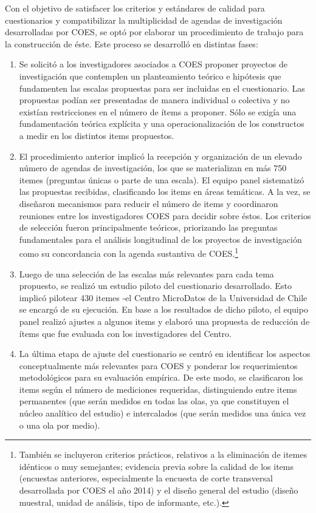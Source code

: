 \documentclass[
]{book}
\begin{document}
Con el objetivo de satisfacer los criterios y estándares de calidad para
cuestionarios y compatibilizar la multiplicidad de agendas de
investigación desarrolladas por COES, se optó por elaborar un
procedimiento de trabajo para la construcción de éste. Este proceso se
desarrolló en distintas fases:

\begin{enumerate}
\def\labelenumi{\arabic{enumi}.}
\item
  Se solicitó a los investigadores asociados a COES proponer proyectos
  de investigación que contemplen un planteamiento teórico e hipótesis
  que fundamenten las escalas propuestas para ser incluidas en el
  cuestionario. Las propuestas podían ser presentadas de manera
  individual o colectiva y no existían restricciones en el número de
  ítems a proponer. Sólo se exigía una fundamentación teórica explícita
  y una operacionalización de los constructos a medir en los distintos
  items propuestos.
\item
  El procedimiento anterior implicó la recepción y organización de un
  elevado número de agendas de investigación, los que se materializan en
  más 750 itemes (preguntas únicas o parte de una escala). El equipo
  panel sistematizó las propuestas recibidas, clasificando los items en
  áreas temáticas. A la vez, se diseñaron mecanismos para reducir el
  número de items y coordinaron reuniones entre los investigadores COES
  para decidir sobre éstos. Los criterios de selección fueron
  principalmente teóricos, priorizando las preguntas fundamentales para
  el análisis longitudinal de los proyectos de investigación como su
  concordancia con la agenda sustantiva de COES.\footnote{También se
    incluyeron criterios prácticos, relativos a la eliminación de itemes
    idénticos o muy semejantes; evidencia previa sobre la calidad de los
    items (encuestas anteriores, especialmente la encuesta de corte
    transversal desarrollada por COES el año 2014) y el diseño general
    del estudio (diseño muestral, unidad de análisis, tipo de
    informante, etc.).}
\item
  Luego de una selección de las escalas más relevantes para cada tema
  propuesto, se realizó un estudio piloto del cuestionario desarrollado.
  Esto implicó pilotear 430 itemes -el Centro MicroDatos de la
  Universidad de Chile se encargó de su ejecución. En base a los
  resultados de dicho piloto, el equipo panel realizó ajustes a algunos
  items y elaboró una propuesta de reducción de ítems que fue evaluada
  con los investigadores del Centro.
\item
  La última etapa de ajuste del cuestionario se centró en identificar
  los aspectos conceptualmente más relevantes para COES y ponderar los
  requerimientos metodológicos para su evaluación empírica. De este
  modo, se clasificaron los items según el número de mediciones
  requeridas, distinguiendo entre items permanentes (que serán medidos
  en todas las olas, ya que constituyen el núcleo analítico del estudio)
  e intercalados (que serán medidos una única vez o una ola por medio).
\end{enumerate}
\end{document}
